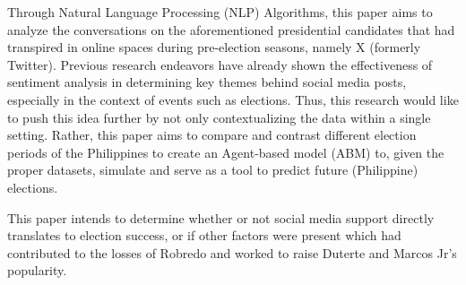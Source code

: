 Through Natural Language Processing (NLP) Algorithms, this paper aims to analyze the conversations on the aforementioned presidential candidates that had transpired in online spaces during pre-election seasons, namely X (formerly Twitter). Previous research endeavors have already shown the effectiveness of sentiment analysis in determining key themes behind social media posts, especially in the context of events such as elections. Thus, this research would like to push this idea further by not only contextualizing the data within a single setting. Rather, this paper aims to compare and contrast different election periods of the Philippines to create an Agent-based model (ABM) to, given the proper datasets, simulate and serve as a tool to predict future (Philippine) elections.

This paper intends to determine whether or not social media support directly translates to election success, or if other factors were present which had contributed to the losses of Robredo and worked to raise Duterte and Marcos Jr’s popularity.